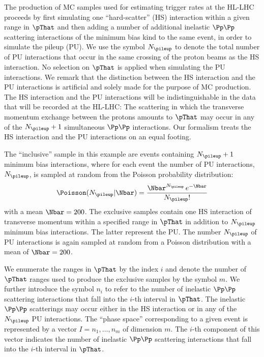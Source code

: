 The production of MC samples used for estimating trigger rates at the HL-LHC
proceeds by first simulating one ``hard-scatter'' (HS) interaction within a given range in $\pThat$
and then adding a number of additional inelastic $\Pp\Pp$ scattering interactions of the minimum bias kind to the same event,
in order to simulate the pileup (PU).
We use the symbol $N_{\pileup}$ to denote the total number of PU interactions 
that occur in the same crossing of the proton beams as the HS interaction.
No selection on $\pThat$ is applied when simulating the PU interactions.
We remark that the distinction between the HS interaction and the PU interactions is artificial and solely made for the purpose of MC production.
The HS interaction and the PU interactions will be indistinguishable in the data that will be recorded at the HL-LHC:
The scattering in which the transverse momentum exchange between the protons amounts to $\pThat$ may occur in any of the $N_{\pileup} + 1$ simultaneous $\Pp\Pp$ interactions.
Our formalism treats the HS interaction and the PU interactions on an equal footing.

The ``inclusive'' sample in this example are events containing $N_{\pileup} + 1$ minimum bias interactions,
where for each event the number of PU interactions, $N_{\pileup}$, is sampled at random from the Poisson probability distribution:
\begin{equation}
\Poisson(N_{\pileup} \vert \Nbar) = \frac{\Nbar^{N_{\pileup}} \, e^{-\Nbar}}{N_{\pileup}!}
\label{eq:Poisson}
\end{equation}
with a mean $\Nbar = 200$.
The exclusive samples contain one HS interaction of transverse momentum within a specified range in $\pThat$ in addition to $N_{\pileup}$ minimum bias interactions.
The latter represent the PU.
The number $N_{\pileup}$ of PU interactions is again sampled at random from a Poisson distribution with a mean of $\Nbar = 200$.

We enumerate the ranges in $\pThat$ by the index $i$ and denote the number of $\pThat$ ranges used to produce the exclusive samples by the symbol $m$.
We further introduce the symbol $n_{i}$ to refer to the number of inelastic $\Pp\Pp$ scattering interactions that fall into the $i$-th interval in $\pThat$.
The inelastic $\Pp\Pp$ scatterings may occur either in the HS interaction or in any of the $N_{\pileup}$ PU interactions.
The ``phase space'' corresponding to a given event is represented by a vector $I=n_{1},\dots,n_{m}$ of dimension $m$.
The $i$-th component of this vector indicates the number of inelastic $\Pp\Pp$ scattering interactions that fall into the $i$-th interval in $\pThat$.

